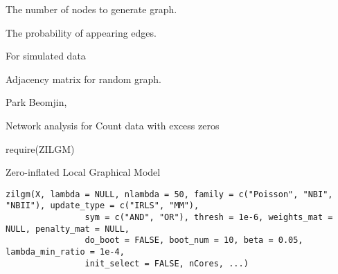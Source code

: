 \documentclass[a4paper]{book}
\begin{document}
%
\begin{Arguments}
\begin{ldescription}
\item[\code{node}] 
The number of nodes to generate graph.

\item[\code{prob}] 
The probability of appearing edges. 

\end{ldescription}
\end{Arguments}
%
\begin{Details}\relax
For simulated data
\end{Details}
%
\begin{Value}
\begin{ldescription}
\item[\code{networkmat}] Adjacency matrix for random graph.
\end{ldescription}
\end{Value}
%
\begin{Author}\relax
Park Beomjin,
\end{Author}
%
\begin{References}\relax
Network analysis for Count data with excess zeros
\end{References}
%
\begin{SeeAlso}\relax
{}
\end{SeeAlso}
%
\begin{Examples}
\begin{ExampleCode}
require(ZILGM)
\end{ExampleCode}
\end{Examples}
%
\begin{Description}\relax
Zero-inflated Local Graphical Model
\end{Description}
%
\begin{Usage}
\begin{verbatim}
zilgm(X, lambda = NULL, nlambda = 50, family = c("Poisson", "NBI", "NBII"), update_type = c("IRLS", "MM"), 
                sym = c("AND", "OR"), thresh = 1e-6, weights_mat = NULL, penalty_mat = NULL,
                do_boot = FALSE, boot_num = 10, beta = 0.05, lambda_min_ratio = 1e-4,
                init_select = FALSE, nCores, ...)
\end{verbatim}
\end{Usage}
%
\end{document}

